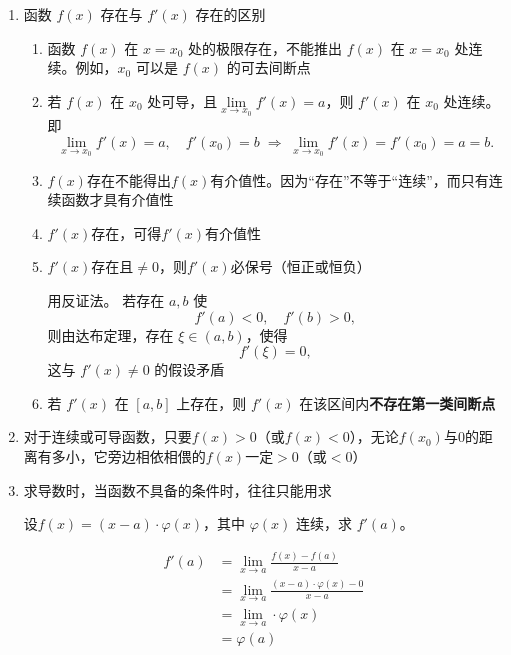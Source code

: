 \documentclass[a4paper,12pt]{article}
\begin{document}
    \begin{enumerate}
        \item 函数 $f(x)$ 存在与 $f'(x)$ 存在的区别
        \begin{enumerate}
            \item 函数 $f(x)$ 在 $x=x_0$ 处的极限存在，不能推出 $f(x)$ 在 $x=x_0$ 处连续。例如，$x_0$ 可以是 $f(x)$ 的可去间断点
            \item 若 $f(x)$ 在 $x_0$ 处可导，且$\lim\limits_{x\to x_0} f'(x)=a$，则 $f'(x)$ 在 $x_0$ 处连续。即
            \[
                \lim_{x\to x_0} f'(x)=a,\quad f'(x_0)=b
                \;\Longrightarrow\;
                \lim_{x\to x_0} f'(x)=f'(x_0)=a=b.
            \]
            \item $f(x)$存在不能得出$f(x)$有介值性。因为“存在”不等于“连续”，而只有连续函数才具有介值性
            \item $f'(x)$存在，可得$f'(x)$有介值性
            \item $f'(x)$存在且$\neq 0$，则$f'(x)$必保号（恒正或恒负）
            \begin{analysisbox}[证]
                用反证法。
                若存在 $a,b$ 使
                \[
                    f'(a)<0,\quad f'(b)>0,
                \]
                则由达布定理，存在 $\xi\in(a,b)$，使得
                \[
                    f'(\xi)=0,
                \]
                这与 $f'(x)\neq0$ 的假设矛盾
            \end{analysisbox}
            \item 若 $f'(x)$ 在 $[a,b]$ 上存在，则 $f'(x)$ 在该区间内\textbf{不存在第一类间断点}
        \end{enumerate}
        \item 对于连续或可导函数，只要$f(x) > 0$（或$f(x) < 0$），无论$f(x_0)$与$0$的距离有多小，它旁边相依相偎的$f(x)$一定$> 0$（或$< 0$）

        \item 求导数时，当函数不具备{\color{red}{导数存在}}的条件时，往往只能用{\color{red}{导数定义}}求
        \begin{analysisbox}[Example]
            设$f(x) = (x-a)\cdot\varphi(x)$，其中 $\varphi(x)$ 连续，求 $f'(a)$。

            \[
                \begin{aligned}
                    f'(a)
                    &= \lim_{x\to a}\frac{f(x)-f(a)}{x-a} \\
                    &= \lim_{x\to a}\frac{(x-a)\cdot\varphi(x)-0}{x-a} \\
                    &= \lim_{x\to a}\cdot\varphi(x) \\
                    &= \varphi(a)
                \end{aligned}
            \]
        \end{analysisbox}


\end{enumerate}
\end{document}
